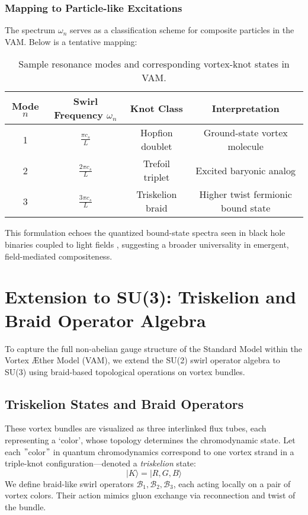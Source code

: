 \subsubsection*{Mapping to Particle-like Excitations}

The spectrum \( \omega_n \) serves as a classification scheme for composite particles in the VAM. Below is a tentative mapping:

\begin{table}[H]
    \centering
    \footnotesize
    \renewcommand{\arraystretch}{1.4}
    \begin{tabular}{|c|c|c|c|}
        \hline
        \textbf{Mode} \( n \) & \textbf{Swirl Frequency} \( \omega_n \) & \textbf{Knot Class} & \textbf{Interpretation} \\
        \hline
        1 & \( \frac{\pi c_s}{L} \) & Hopfion doublet & Ground-state vortex molecule \\
        2 & \( \frac{2\pi c_s}{L} \) & Trefoil triplet & Excited baryonic analog \\
        3 & \( \frac{3\pi c_s}{L} \) & Triskelion braid & Higher twist fermionic bound state \\
        \hline
    \end{tabular}
    \caption{Sample resonance modes and corresponding vortex-knot states in VAM.}
\end{table}

This formulation echoes the quantized bound-state spectra seen in black hole binaries coupled to light fields \cite{baumann2023black}, suggesting a broader universality in emergent, field-mediated compositeness.



\section{Extension to SU(3): Triskelion and Braid Operator Algebra}

To capture the full non-abelian gauge structure of the Standard Model within the Vortex Æther Model (VAM), we extend the SU(2) swirl operator algebra to SU(3) using braid-based topological operations on vortex bundles.

\subsection*{Triskelion States and Braid Operators}

These vortex bundles are visualized as three interlinked flux tubes, each representing a ‘color', whose topology determines the chromodynamic state.
Let each \("\)color\("\) in quantum chromodynamics correspond to one vortex strand in a triple-knot configuration—denoted a \textit{triskelion} state:
\[
|K\rangle = |R, G, B\rangle
\]
We define braid-like swirl operators \( \mathcal{B}_1, \mathcal{B}_2, \mathcal{B}_3 \), each acting locally on a pair of vortex colors. Their action mimics gluon exchange via reconnection and twist of the bundle.

